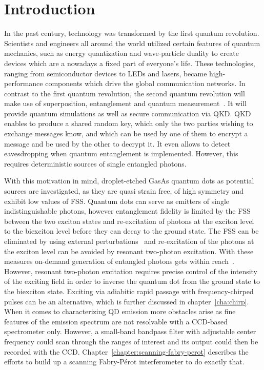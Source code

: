 \chapter{Introduction}

In the past century, technology was transformed by the first quantum revolution. Scientists and engineers all around the world utilized certain features of quantum mechanics, such as energy quantization and wave-particle duality to create devices which are a nowadays a fixed part of everyone's life.
These technologies, ranging from semiconductor devices to LEDs and lasers, became high-performance components which drive the global communication networks.
In contrast to the first quantum revolution, the second quantum revolution will make use of superposition, entanglement and quantum measurement~\cite{macfarlane_quantum_2003}.
It will provide quantum simulations as well as secure communication via \ac{QKD}.
\ac{QKD} enables to produce a shared random key, which only the two parties wishing to exchange messages know, and which can be used by one of them to encrypt a message and be used by the other to decrypt it.
It even allows to detect eavesdropping when quantum entanglement is implemented.
However, this requires deterministic sources of single entangled photons.

With this motivation in mind, droplet-etched GasAs quantum dots as potential sources are investigated, as they are quasi strain free, of high symmetry and exhibit low values of \ac{FSS}.
Quantum dots can serve as emitters of single indistinguishable photons, however entanglement fidelity is limited by the \acs{FSS} between the two exciton states \cite{bayer_fine_2002} and re-excitation of photons at the exciton level to the biexciton level before they can decay to the ground state.
The \ac{FSS} can be eliminated by using external perturbations~\cite{plumhof_experimental_2012} and re-excitation of the photons at the exciton level can be avoided by resonant two-photon excitation.
With these measures on-demand generation of entangled photons gets within reach~\cite{jayakumar_deterministic_2013}.
However, resonant two-photon excitation requires precise control of the intensity of the exciting field in order to inverse the quantum dot from the ground state to the biexciton state.
Exciting via adiabitic rapid passage with frequency-chirped pulses can be an alternative, which is further discussed in chapter~\ref{cha:chirp}.
When it comes to characterizing \ac{QD} emission more obstacles arise as fine features of the emission spectrum are not resolvable with a CCD-based spectrometer only.
However, a small-band bandpass filter with adjustable center frequency could scan through the ranges of interest and its output could then be recorded with the CCD.
Chapter~\ref{chapter:scanning-fabry-perot} describes the efforts to build up a scanning Fabry-Pérot interferometer to do exactly that.


